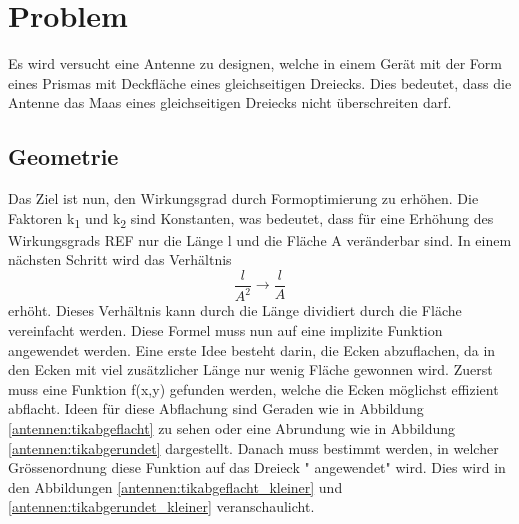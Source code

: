 %
%
% 
%
%

\section{Problem\label{antennen:problemstellung}}
 Es wird versucht eine Antenne zu designen, welche in einem Gerät mit der Form 
 eines Prismas mit Deckfläche eines gleichseitigen Dreiecks. Dies bedeutet, dass 
 die Antenne das Maas eines gleichseitigen Dreiecks nicht überschreiten darf.
 
\subsection{Geometrie\label{antennen:Geom}}
Das Ziel ist nun, den Wirkungsgrad durch Formoptimierung zu erhöhen. 
Die Faktoren k\textsubscript{1} und k\textsubscript{2} sind Konstanten, 
was bedeutet, dass für eine Erhöhung des Wirkungsgrads REF nur die Länge 
l und die Fläche A veränderbar sind. In einem nächsten Schritt wird das Verhältnis
\begin{equation}
	\frac{l}{A^2} \rightarrow \frac{l}{A}
	\label{antennen:Verhältnis}
\end{equation}
erhöht. Dieses Verhältnis kann durch die Länge dividiert durch die Fläche 
vereinfacht werden. Diese Formel muss nun auf eine implizite Funktion angewendet 
werden. Eine erste Idee besteht darin, die Ecken abzuflachen, da in den Ecken 
mit viel zusätzlicher Länge nur wenig Fläche gewonnen wird. Zuerst muss eine 
Funktion f(x,y) gefunden werden, welche die Ecken möglichst effizient abflacht. 
Ideen für diese Abflachung sind Geraden wie in Abbildung \ref{antennen:tikabgeflacht} 
zu sehen oder eine Abrundung wie in Abbildung \ref{antennen:tikabgerundet} dargestellt.
 Danach muss bestimmt werden, in welcher Grössenordnung diese Funktion auf das 
 Dreieck " angewendet"  wird. Dies wird in den Abbildungen \ref{antennen:tikabgeflacht_kleiner} 
 und \ref{antennen:tikabgerundet_kleiner} veranschaulicht.

